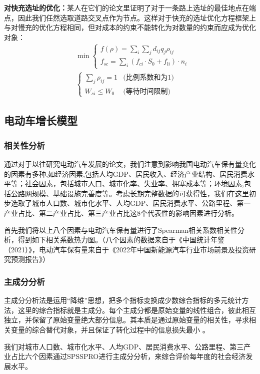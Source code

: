 \documentclass[12pt, a4paper, oneside]{ctexart}
\begin{document}
\textbf{对快充选址的优化：}某人在它们的论文里证明了对于一条路上选址的最佳地点在端点，因此我们任然选取道路交叉点作为节点。这样对于快充的选址优化方程框架上与对慢充的优化方程相同，但对成本的约束不能转化为对数量的约束而应成为优化对象：
\begin{align*}
    & \min  \begin{cases}
        f(\rho)=\sum_i \sum_jd_{ij} q_j \rho_{ij}\\
        f_{sc}=\sum\limits_{i}(f_{ci}\cdot S_0+f_{li})\cdot n_i
    \end{cases} \\
    & \begin{cases}
       \sum\limits_j \rho_{ij}=1    & \text{(比例系数和为1)} \\
       W_{si}\leqslant W_0 & \text{(等待时间限制)}
   \end{cases}
\end{align*}
\subsection{电动车增长模型}
\subsubsection{相关性分析}
通过对于以往研究电动汽车发展的论文，我们注意到影响我国电动汽车保有量变化的因素有多种,如经济因素,包括人均GDP、居民收入、经济产业结构、居民消费水平等；社会因素，包括城市人口、城市化率、失业率、拥塞成本等；环境因素,包括公路网规模、基础设施完善度等。考虑长期完整数据的可获得性，我们在这里初步选取了城市人口数、城市化水平、人均GDP、居民消费水平、公路里程、第一产业占比、第二产业占比、第三产业占比这8个代表性的影响因素进行分析。

首先我们将以上八个因素与电动汽车保有量进行了Spearman相关系数相关性分析，得到如下相关系数热力图。（八个因素的数据来自于《中国统计年鉴（2021）》\cite{cite:统计年鉴}，电动汽车保有量来自于《2022年中国新能源汽车行业市场前景及投资研究预测报告》\cite{cite:预测报告}）
\subsubsection{主成分分析}
主成分分析法是运用“降维”思想，把多个指标变换成少数综合指标的多元统计方法，这里的综合指标就是主成分。每个主成分都是原始变量的线性组合，彼此相互独立，并保留了原始变量绝大部分信息。其本质是通过原始变量的相关性，寻求相关变量的综合替代对象，并且保证了转化过程中的信息损失最小 。

我们对城市人口数、城市化水平、人均GDP、居民消费水平、公路里程、第三产业占比六个因素通过SPSSPRO进行主成分分析，来综合评价每年度的社会经济发展水平。
\end{document}
